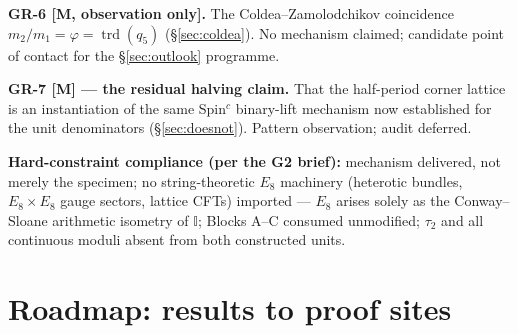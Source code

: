 \documentclass[11pt,a4paper]{article}
\theoremstyle{plain}
\theoremstyle{definition}
\theoremstyle{remark}
\newcommand{\Ico}{\mathbb{I}}
\newcommand{\rtag}[1]{\textnormal{\textbf{[#1]}}}
\DeclareMathOperator{\trd}{trd}
\begin{document}
\begin{gapbox}
\smallskip
\textbf{GR-6 \rtag{M, observation only}.} The Coldea--Zamolodchikov coincidence $m_2/m_1 = \varphi = \trd(q_5)$ (\S\ref{sec:coldea}). No mechanism claimed; candidate point of contact for the \S\ref{sec:outlook} programme.

\smallskip
\textbf{GR-7 \rtag{M} --- the residual halving claim.} That the half-period corner lattice is an instantiation of the same Spin$^c$ binary-lift mechanism now established for the unit denominators (\S\ref{sec:doesnot}). Pattern observation; audit deferred.

\smallskip
\textbf{Hard-constraint compliance (per the G2 brief):} mechanism delivered, not merely the specimen; no string-theoretic $E_8$ machinery (heterotic bundles, $E_8 \times E_8$ gauge sectors, lattice CFTs) imported --- $E_8$ arises solely as the Conway--Sloane arithmetic isometry of $\Ico$; Blocks A--C consumed unmodified; $\tau_2$ and all continuous moduli absent from both constructed units.
\end{gapbox}

\section{Roadmap: results to proof sites}\label{sec:roadmap}
\end{document}
